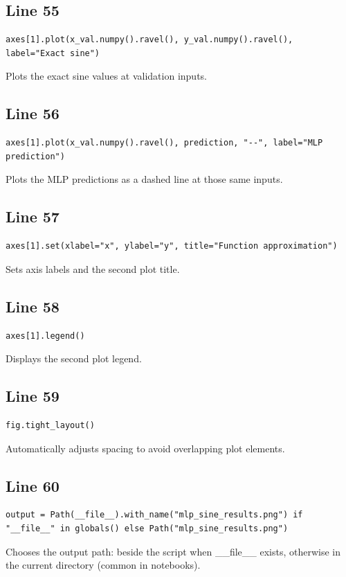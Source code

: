 \documentclass[11pt,a4paper]{article}
\begin{document}
\subsection*{Line 55}
\begin{lstlisting}
axes[1].plot(x_val.numpy().ravel(), y_val.numpy().ravel(), label="Exact sine")
\end{lstlisting}
Plots the exact sine values at validation inputs.

\subsection*{Line 56}
\begin{lstlisting}
axes[1].plot(x_val.numpy().ravel(), prediction, "--", label="MLP prediction")
\end{lstlisting}
Plots the MLP predictions as a dashed line at those same inputs.

\subsection*{Line 57}
\begin{lstlisting}
axes[1].set(xlabel="x", ylabel="y", title="Function approximation")
\end{lstlisting}
Sets axis labels and the second plot title.

\subsection*{Line 58}
\begin{lstlisting}
axes[1].legend()
\end{lstlisting}
Displays the second plot legend.

\subsection*{Line 59}
\begin{lstlisting}
fig.tight_layout()
\end{lstlisting}
Automatically adjusts spacing to avoid overlapping plot elements.

\subsection*{Line 60}
\begin{lstlisting}
output = Path(__file__).with_name("mlp_sine_results.png") if "__file__" in globals() else Path("mlp_sine_results.png")
\end{lstlisting}
Chooses the output path: beside the script when \_\_file\_\_ exists, otherwise in the current directory (common in notebooks).
\end{document}
